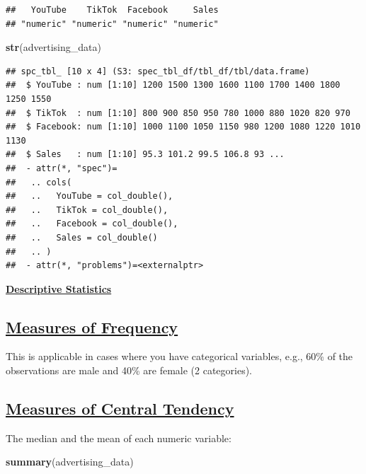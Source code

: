 \documentclass[
]{article}
\newenvironment{Shaded}{\begin{snugshade}}{\end{snugshade}}
\newcommand{\FunctionTok}[1]{\textcolor[rgb]{0.13,0.29,0.53}{\textbf{#1}}}
\newcommand{\NormalTok}[1]{#1}
\begin{document}
\begin{verbatim}
##   YouTube    TikTok  Facebook     Sales 
## "numeric" "numeric" "numeric" "numeric"
\end{verbatim}

\begin{Shaded}
\begin{Highlighting}[]
\FunctionTok{str}\NormalTok{(advertising\_data)}
\end{Highlighting}
\end{Shaded}

\begin{verbatim}
## spc_tbl_ [10 x 4] (S3: spec_tbl_df/tbl_df/tbl/data.frame)
##  $ YouTube : num [1:10] 1200 1500 1300 1600 1100 1700 1400 1800 1250 1550
##  $ TikTok  : num [1:10] 800 900 850 950 780 1000 880 1020 820 970
##  $ Facebook: num [1:10] 1000 1100 1050 1150 980 1200 1080 1220 1010 1130
##  $ Sales   : num [1:10] 95.3 101.2 99.5 106.8 93 ...
##  - attr(*, "spec")=
##   .. cols(
##   ..   YouTube = col_double(),
##   ..   TikTok = col_double(),
##   ..   Facebook = col_double(),
##   ..   Sales = col_double()
##   .. )
##  - attr(*, "problems")=<externalptr>
\end{verbatim}

\ul{\textbf{Descriptive Statistics}}

\subsection{\texorpdfstring{\ul{\textbf{Measures of
Frequency}}}{Measures of Frequency}}\label{measures-of-frequency}

This is applicable in cases where you have categorical variables, e.g.,
60\% of the observations are male and 40\% are female (2 categories).

\subsection{\texorpdfstring{\ul{\textbf{Measures of Central
Tendency}}}{Measures of Central Tendency}}\label{measures-of-central-tendency}

The median and the mean of each numeric variable:

\begin{Shaded}
\begin{Highlighting}[]
\FunctionTok{summary}\NormalTok{(advertising\_data)}
\end{Highlighting}
\end{Shaded}
\end{document}
